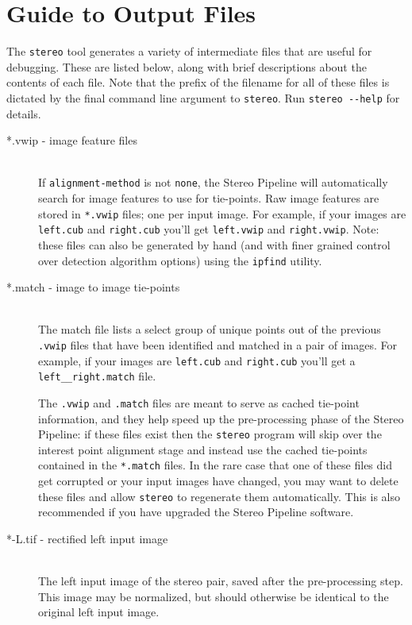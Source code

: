 \chapter{Guide to Output Files}
\label{chapter:outputfiles}

The {\tt stereo} tool generates a variety of intermediate files that
are useful for debugging.  These are listed below, along with brief
descriptions about the contents of each file.  Note that the prefix of
the filename for all of these files is dictated by the final command
line argument to {\tt stereo}.  Run {\tt stereo -\/-help} for details.

\begin{description}

\item[*.vwip \textnormal{- image feature files}] \hfill \\
  If \texttt{alignment-method} is not \texttt{none}, the Stereo
  Pipeline will automatically search for image features to use for
  tie-points.  Raw image features are stored in \texttt{*.vwip} files;
  one per input image. For example, if your images are
  \texttt{left.cub} and \texttt{right.cub} you'll get
  \texttt{left.vwip} and \texttt{right.vwip}.  Note: these files can
  also be generated by hand (and with finer grained control over
  detection algorithm options) using the {\tt ipfind} utility.

\item[*.match \textnormal{- image to image tie-points}] \hfill \\
  The match file lists a select group of unique points out of the
  previous \texttt{.vwip} files that have been identified and matched
  in a pair of images.  For example, if your images are
  \texttt{left.cub} and \texttt{right.cub} you'll get a
  \texttt{left\_\_right.match} file.

  The \texttt{.vwip} and \texttt{.match} files are meant to serve
  as cached tie-point information, and they help speed up the
  pre-processing phase of the Stereo Pipeline: if these files exist
  then the \texttt{stereo} program will skip over the interest point
  alignment stage and instead use the cached tie-points contained
  in the \texttt{*.match} files.  In the rare case that one of these files
  did get corrupted or your input images have changed, you may want
  to delete these files and allow {\tt stereo} to regenerate them
  automatically.  This is also recommended if you have upgraded the
  Stereo Pipeline software.

\item[*-L.tif - \textnormal{rectified left input image}] \hfill \\
  The left input image of the stereo pair, saved after the
  pre-processing step.  This image may be normalized, but should
  otherwise be identical to the original left input image.


\end{description}
